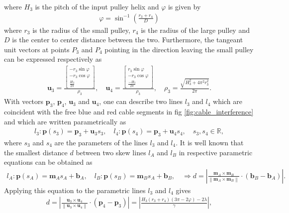 \documentclass[10pt,cleanfoot]{asme2ej}
\newcommand\abs[1]{\left|#1\right|}
\newcommand\norm[1]{\left\lVert#1\right\rVert}
\begin{document}
where $H_3$ is the pitch of the input pulley helix and $\varphi$ is given by
\begin{align}
\varphi = \sin^{-1}\left(\frac{r_3+r_4}{D}\right)
\end{align} where $r_3$ is the radius of the small pulley, $r_4$ is the radius of the large pulley and $D$ is the center to center distance between the two. Furthermore, the tangeant unit vectors at points $P_3$ and $P_4$ pointing in the direction leaving the small pulley can be expressed respectively as 
\begin{align}
\mathbf{u}_3 = \frac{\begin{bmatrix}
-r_3\sin\varphi\\
-r_3\cos\varphi\\
\frac{H_3}{2\pi}
\end{bmatrix}}{\rho_3}, \quad \mathbf{u}_4 =\frac{\begin{bmatrix}
r_3\sin\varphi\\
-r_3\cos\varphi\\
\frac{-H_3}{2\pi}
\end{bmatrix}}{\rho_3}, \quad \rho_3 = \frac{\sqrt{H_3^2+4\pi^2r_3^2}}{2\pi}.
\end{align} 
With vectors $\mathbf{p}_3$, $\mathbf{p}_4$, $\mathbf{u}_3$ and $\mathbf{u}_4$, one can describe two lines $l_3$ and $l_4$ which are coincident with the free blue and red cable segments in fig \ref{fig:cable_interference} and which are written parametrically as
\begin{align}
l_3:\mathbf{p}(s_3) = \mathbf{p}_3 + \mathbf{u}_3s_3, \quad l_4:\mathbf{p}(s_4) = \mathbf{p}_3 + \mathbf{u}_4s_4,\quad s_3,s_4 \in \mathbb{R},
\label{eq:eq_of_two_lines}
\end{align}
where $s_3$ and $s_4$ are the parameters of the lines $l_3$ and $l_4$. It is well known that the smallest distance $d$ between two skew lines $l_A$ and $l_B$ in respective parametric equations can be obtained as \begin{align}
l_A: \mathbf{p}(s_A) = \mathbf{m}_As_A+\mathbf{b}_A,\quad l_B: \mathbf{p}(s_B) = \mathbf{m}_Bs_A+\mathbf{b}_B,\quad \Rightarrow d = \abs{\frac{\mathbf{m}_A\times\mathbf{m}_B}{\norm{\mathbf{m}_A\times\mathbf{m}_B}}\cdot\left(\mathbf{b}_B-\mathbf{b}_A\right)}.
\end{align}
Applying this equation to the parametric lines $l_3$ and $l_4$ gives
\begin{align}
d = \abs{\frac{\mathbf{u}_3\times\mathbf{u}_4}{\norm{\mathbf{u}_3\times\mathbf{u}_4}}\cdot\left(\mathbf{p}_4-\mathbf{p}_3\right)} = \abs{\frac{H_3(r_3+r_4)(3\pi-2\varphi)-2\lambda}{\gamma}},
\label{eq:distance_func}
\end{align}
\end{document}
